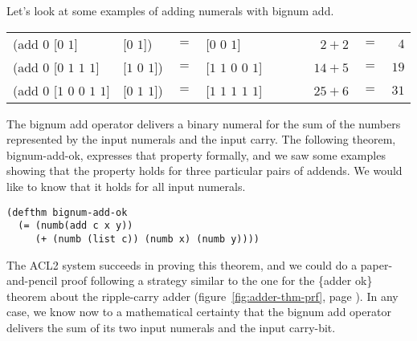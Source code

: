 Let's look at some examples of adding numerals with bignum \textsf{add}.
\begin{center}
\addtolength{\tabcolsep}{-4pt}
\begin{tabular}{llclr|l|rcr}
\textsf{(add $0$ [$0$ $1$]}             &\textsf{[$0$ $1$])}     & $=$ &\textsf{[$0$ $0$ $1$]}         &&& ~~$2 + 2$  &$=$& $4$  \\
\textsf{(add $0$ [$0$ $1$ $1$ $1$]}     &\textsf{[$1$ $0$ $1$])} & $=$ &\textsf{[$1$ $1$ $0$ $0$ $1$]} &&& ~~$14 + 5$ &$=$& $19$ \\
\textsf{(add $0$ [$1$ $0$ $0$ $1$ $1$]} &\textsf{[$0$ $1$ $1$])} & $=$ &\textsf{[$1$ $1$ $1$ $1$ $1$]} &&& ~~$25 + 6$ &$=$& $31$ \\
\end{tabular}
\addtolength{\tabcolsep}{4pt}
\end{center}

The bignum \textsf{add} operator
delivers a binary numeral for the sum of
the numbers represented by the input numerals and the input carry.
The following theorem, \textsf{bignum-add-ok},
expresses that property formally,
and we saw some examples showing
that the property holds for three
particular pairs of addends.
We would like to know that it
holds for all input numerals.

\label{bignum-adder-thm}
\begin{code}
\begin{verbatim}
(defthm bignum-add-ok
  (= (numb(add c x y))
     (+ (numb (list c)) (numb x) (numb y))))
\end{verbatim}
\end{code}

The ACL2 system succeeds in proving this theorem,
and we could do a paper-and-pencil proof following a strategy
similar to the one for the \{adder ok\} theorem about the ripple-carry adder
(figure~\ref{fig:adder-thm-prf}, page \pageref{fig:adder-thm-prf}).
In any case, we know now to a mathematical certainty
that the bignum \textsf{add} operator delivers
the sum of its two input numerals and the input carry-bit.

\begin{exercises}

\end{exercises}

